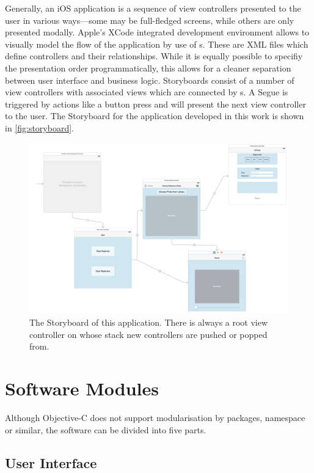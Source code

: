 Generally, an iOS application is a sequence of view controllers presented to the
user in various ways---some may be full-fledged screens, while others are only
presented modally. Apple's XCode integrated development environment allows to
visually model the flow of the application by use of s. These
are XML files which define controllers and their relationships. While
it is equally possible to specifiy the presentation order programmatically, this
allows for a cleaner separation between user interface and business logic.
Storyboards consist of a number of view controllers with associated views which
are connected by s. A Segue is triggered by actions like a button
press and will present the next view controller to the user. The Storyboard for
the application developed in this work is shown in \autoref{fig:storyboard}.

\begin{figure}[h]
   {\centering      
   \includegraphics[width=\textwidth]{gfx/storyboard.png}
   \caption[Storyboard example]{The Storyboard of this application. There is
   always a root view controller on whose stack new controllers are pushed or
popped from.}
   \label{fig:storyboard}}
\end{figure}

\section{Software Modules}

Although Objective-C does not support modularisation by packages, namespace or
similar, the software can be divided into five parts.

\subsection{User Interface}

